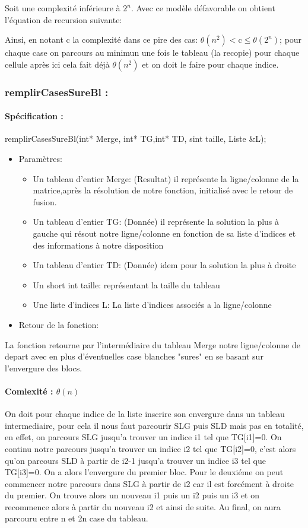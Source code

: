 \documentclass{article}
\begin{document}
Soit une complexité inférieure à $2^n$.
\newline
Avec ce modèle défavorable on obtient l'équation de recursion suivante:
\begin{center}
\end{center}
Ainsi, en notant c la complexité dans ce pire des cas: $\theta(n^2) <$c$\leq\theta(2^n)$; pour chaque case on parcours au minimun une fois le tableau (la recopie) pour chaque cellule après ici cela fait déjà $\theta(n^2)$ et on doit le faire pour chaque indice.
\subsubsection{remplirCasesSureBl :}
\paragraph{Spécification :}remplirCasesSureBl(int* Merge, int* TG,int* TD, sint taille, Liste \&L);
\begin{itemize}
\item Paramètres:
\begin{itemize}
\item Un tableau d'entier Merge: (Resultat) il représente la ligne/colonne de la matrice,après la résolution de notre fonction, initialisé avec le retour de fusion.
\item Un tableau d'entier TG: (Donnée) il représente la solution la plus à gauche qui résout notre ligne/colonne en fonction de sa liste d'indices et des informations à notre disposition
\item Un tableau d'entier TD: (Donnée) idem pour la solution la plus à droite
\item Un short int taille: représentant la taille du tableau
\item Une liste d'indices L: La liste d'indices associés a la ligne/colonne
\end{itemize}
\item Retour de la fonction:
\end{itemize}
La fonction retourne par l'intermédiaire du tableau Merge notre ligne/colonne de depart avec en plus d'éventuelles case blanches "sures" en se basant sur l'envergure des blocs.
\paragraph{Comlexité : $\theta(n)$\newline}
On doit pour chaque indice de la liste inscrire son envergure dans un tableau intermediaire, pour cela il nous faut parcourir SLG puis SLD mais pas en totalité, en effet, on parcours SLG jusqu'a trouver un indice i1 tel que TG[i1]=0.
On continu notre parcours jusqu'a trouver un indice i2 tel que TG[i2]=0, c'est alors qu'on parcours SLD à partir de i2-1 jusqu'a trouver un indice i3 tel que TG[i3]=0. 
On a alors l'envergure du premier bloc. Pour le deuxiéme on peut commencer notre parcours dans SLG à partir de i2 car il est forcément à droite du premier.\newline 
On trouve alors un nouveau i1 puis un i2 puis un i3 et on recommence alors à partir du nouveau i2 et ainsi de suite. Au final, on aura parcouru entre n et 2n case du tableau.
\end{document}
